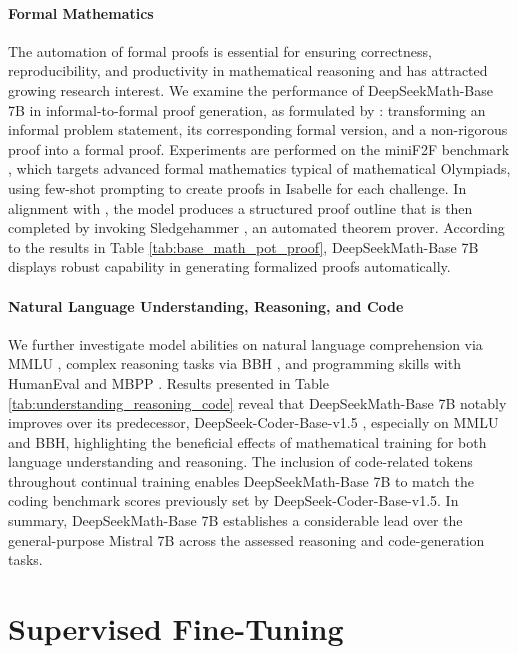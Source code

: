 \begin{itemize}[topsep=0pt]
\paragraph{Formal Mathematics}

The automation of formal proofs is essential for ensuring correctness, reproducibility, and productivity in mathematical reasoning and has attracted growing research interest. We examine the performance of DeepSeekMath-Base 7B in informal-to-formal proof generation, as formulated by \citep{dsp_proof}: transforming an informal problem statement, its corresponding formal version, and a non-rigorous proof into a formal proof. Experiments are performed on the miniF2F benchmark \citep{minif2f}, which targets advanced formal mathematics typical of mathematical Olympiads, using few-shot prompting to create proofs in Isabelle for each challenge. In alignment with \cite{dsp_proof}, the model produces a structured proof outline that is then completed by invoking Sledgehammer \citep{sledgehammer}, an automated theorem prover. According to the results in Table \ref{tab:base_math_pot_proof}, DeepSeekMath-Base 7B displays robust capability in generating formalized proofs automatically.

\paragraph{Natural Language Understanding, Reasoning, and Code}

We further investigate model abilities on natural language comprehension via MMLU \citep{mmlu}, complex reasoning tasks via BBH \citep{bbh}, and programming skills with HumanEval \citep{codex} and MBPP \citep{mbpp}. Results presented in Table \ref{tab:understanding_reasoning_code} reveal that DeepSeekMath-Base 7B notably improves over its predecessor, DeepSeek-Coder-Base-v1.5 \citep{deepseek-coder}, especially on MMLU and BBH, highlighting the beneficial effects of mathematical training for both language understanding and reasoning. The inclusion of code-related tokens throughout continual training enables DeepSeekMath-Base 7B to match the coding benchmark scores previously set by DeepSeek-Coder-Base-v1.5. In summary, DeepSeekMath-Base 7B establishes a considerable lead over the general-purpose Mistral 7B \citep{mistral} across the assessed reasoning and code-generation tasks.

\section{Supervised Fine-Tuning}


\end{itemize}

